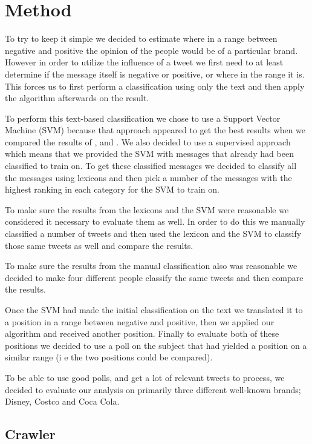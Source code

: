 \documentclass[a4paper,12pt]{report}
\begin{document}
\chapter{Method}

To try to keep it simple we decided to estimate where in a range between negative and positive the opinion of the people would be of a particular brand.
However in order to utilize the influence of a tweet we first need to at least determine if the message itself is negative or positive, or where in the range it is.
This forces us to first perform a classification using only the text and then apply the algorithm afterwards on the result.

To perform this text-based classification we chose to use a Support Vector Machine (SVM) because that approach appeared to get the best results when we compared the results of \cite{Pang02}, \cite{Turney02} and \cite{Taboada10}.
We also decided to use a supervised approach which means that we provided the SVM with messages that already had been classified to train on.
To get these classified messages we decided to classify all the messages using lexicons and then pick a number of the messages with the highest ranking in each category for the SVM to train on.

To make sure the results from the lexicons and the SVM were reasonable we considered it necessary to evaluate them as well. 
In order to do this we manually classified a number of tweets and then used the lexicon and the SVM to classify those same tweets as well and compare the results.

To make sure the results from the manual classification also was reasonable we decided to make four different people classify the same tweets and then compare the results.

Once the SVM had made the initial classification on the text we translated it to a position in a range between negative and positive, then we applied our algorithm and received another position. Finally to evaluate both of these positions we decided to use a poll on the subject that had yielded a position on a similar range (i e the two positions could be compared).

To be able to use good polls, and get a lot of relevant tweets to process, we decided to evaluate our analysis on primarily three different well-known brands; Disney, Costco and Coca Cola.

\section{Crawler}
\end{document}
